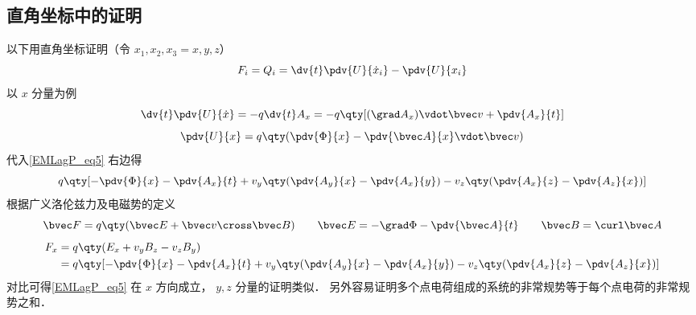 \subsection{直角坐标中的证明}
以下用直角坐标证明（令 $x_1, x_2, x_3 = x,y,z$）
\begin{equation}\label{EMLagP_eq5}
F_i = Q_i =  \dv{t} \pdv{U}{\dot x_i} - \pdv{U}{x_i}
\end{equation}
以 $x$ 分量为例
\begin{equation}
\dv{t} \pdv{U}{\dot x} =  - q\dv{t} A_x =  - q\qty[ (\grad A_x) \vdot \bvec v + \pdv{A_x}{t} ]
\end{equation}
\begin{equation}
\pdv{U}{x} = q\qty( \pdv{\Phi}{x} - \pdv{\bvec A}{x} \vdot \bvec v )
\end{equation}
代入\autoref{EMLagP_eq5} 右边得
\begin{equation}
q\qty[ -\pdv{\Phi}{x} - \pdv{A_x}{t} + v_y \qty( \pdv{A_y}{x} - \pdv{A_x}{y} ) - v_z \qty( \pdv{A_x}{z} - \pdv{A_z}{x}) ]
\end{equation} 
根据广义洛伦兹力及电磁势的定义
\begin{equation}
\bvec F = q\qty(\bvec E + \bvec v \cross \bvec B)
\qquad
\bvec E =  - \grad \Phi  - \pdv{\bvec A}{t}
\qquad
\bvec B = \curl \bvec A
\end{equation}
\begin{equation}\begin{aligned}
F_x &= q \qty(E_x + v_y B_z - v_z B_y) \\
&= q\qty[ - \pdv{\Phi}{x} - \pdv{A_x}{t} + v_y \qty(\pdv{A_y}{x} - \pdv{A_x}{y}) - v_z \qty( \pdv{A_x}{z} - \pdv{A_z}{x}) ]
\end{aligned}\end{equation}
对比可得\autoref{EMLagP_eq5} 在 $x$ 方向成立， $y,z$ 分量的证明类似． 另外容易证明多个点电荷组成的系统的非常规势等于每个点电荷的非常规势之和．

